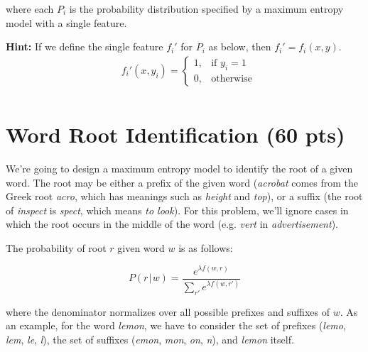\documentclass[11pt,twoside]{article}
\begin{document}
where each $P_{i}$ is the probability distribution specified by a maximum entropy model with a single feature.

\textbf{Hint:} If we define the single feature $f_i'$ for $P_i$ as below, then $f_i' = f_i(x, y)$.
\begin{align*}
& f_i'(x, y_i) = 
	\begin{cases}
		1, & \text{if } y_i = 1\\
		0, & \text{otherwise}
	\end{cases} \\
\end{align*}


\section{Word Root Identification (60 pts)}
We're going to design a maximum entropy model to identify the root of a given word. The root may be either a prefix of the given word (\emph{acrobat} comes from the Greek root \emph{acro}, which has meanings such as \emph{height} and \emph{top}), or a suffix (the root of \emph{inspect} is \emph{spect}, which means \emph{to look}). For this problem, we'll ignore cases in which the root occurs in the middle of the word (e.g. \emph{vert} in \emph{advertisement}).

The probability of root $r$ given word $w$ is as follows:

\[
P \left( r \hspace{1pt}\vert\hspace{1pt} w \right) = \frac{e^{\lambda f(w,r)}}
{\displaystyle\sum\limits_{r'} e^{\lambda f(w,r')}}
\]

where the denominator normalizes over all possible prefixes and suffixes of $w$. As an example, for the word \emph{lemon}, we have to consider the set of prefixes (\emph{lemo}, \emph{lem}, \emph{le}, \emph{l}), the set of suffixes (\emph{emon}, \emph{mon}, \emph{on}, \emph{n}), and \emph{lemon} itself.
\end{document}
